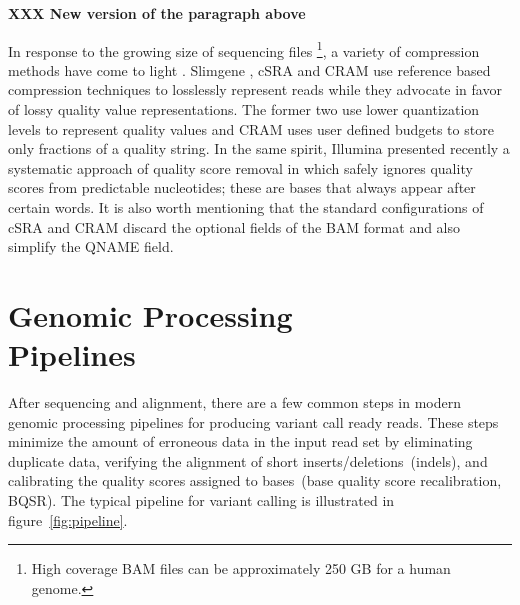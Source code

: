\documentclass[10pt,twocolumn]{article}
\begin{document}
{\bf XXX New version of the paragraph above}

In response to the growing size of sequencing files \footnote{High coverage BAM files can be approximately 250 GB for a human genome.},
a variety of compression methods have come to light \cite{kozanitis2011, fritz11, WanBioinformatics, Popitsch2012, Asnani2012, CoxBW, 
recoil, Jones2012, Janin2013}. Slimgene \cite{kozanitis2011}, cSRA \cite{SRA} and CRAM \cite{fritz11} use reference based compression
techniques to losslessly represent reads while they advocate in favor of lossy quality value representations. The former two use lower
quantization levels to represent quality values and CRAM uses user defined budgets to store only fractions of a quality string. 
In the same spirit, Illumina presented recently
a systematic approach of quality score removal in \cite{Janin2013} which safely ignores quality scores from predictable nucleotides; these
are bases that always appear after certain words. It is also worth mentioning that the standard configurations of cSRA and CRAM discard
the optional fields of the BAM format and also simplify the QNAME field. 

\section{Genomic Processing\\Pipelines}
\label{sec:genomic-processing-pipelines}

After sequencing and alignment, there are a few common steps in modern genomic processing pipelines for producing
variant call ready reads. These steps minimize the amount of erroneous data in the input read set by eliminating duplicate data,
verifying the alignment of short inserts/deletions~(indels), and calibrating the quality scores assigned to bases~(base quality score
recalibration, BQSR). The typical pipeline for variant calling is illustrated in figure~\ref{fig:pipeline}.
\end{document}
